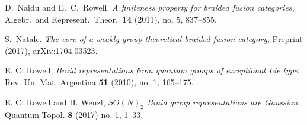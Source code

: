 \documentclass[12pt]{article}
\theoremstyle{plain} \numberwithin{equation}{section}
\theoremstyle{definition}
\begin{document}
\begin{thebibliography}{0}
    
 D.\ Naidu and E.\ C.\ Rowell. \emph{A finiteness property for braided fusion categories}, Algebr.\ and Represent.\ Theor.\ \textbf{14} (2011), no. 5, 837--855.

 S.\ Natale. \emph{The core of a weakly group-theoretical braided fusion category}, Preprint (2017), arXiv:1704.03523.

  E. C. Rowell, \emph{Braid representations from quantum groups of exceptional Lie type}, Rev. Un. Mat. Argentina \textbf{51} (2010), no. 1, 165--175.

    E. C. Rowell and H. Wenzl, \emph{$SO(N)_2$ Braid group representations are Gaussian}, Quantum Topol. \textbf{8} (2017) no. 1, 1--33.
    
\end{thebibliography}
\end{document}
